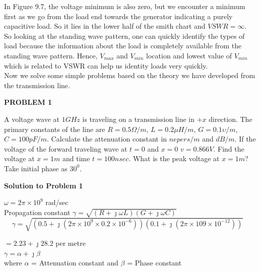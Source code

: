 In Figure 9.7, the voltage minimum is also zero, but we encounter a minimum first as we go from the load end towards the generator indicating a purely capacitive load. So it lies in the lower half of the smith chart and $VSWR=\infty$.\\

So looking at the standing wave pattern, one can quickly identify the types of load because the information about the load is completely available from the standing wave pattern. Hence, ${V_{max}}$ and ${V_{min}}$ location and lowest value of ${V_{min}}$ which is related to VSWR can help us identity loads very quickly.\\

Now we solve some simple problems based on the theory we have developed from the transmission line.\\

\begin{center}
\textbf{PROBLEM 1}
\end{center}

A voltage wave at ${1GH}z$ is traveling on a transmission line in ${+x}$ direction. The primary constants of the line are ${R=0.5\Omega/m}$, ${L=0.2\mu H/m}$, ${G=0.1\upsilon/m}$, ${C=100pF/m}$. Calculate the attenuation constant in ${nepers/m}$ and ${dB/m}$. If the voltage of the forward traveling wave at ${t=0}$ and ${x=0}$ ${v}=0.866V$. Find the voltage at ${x=1m}$ and time ${t=100nsec}$. What is the peak voltage at ${x=1m?}$ Take initial phase as ${30^0}$.


\begin{center}
\textbf{Solution to Problem 1}
\end{center}
$ \omega = 2\pi\times 10^{9} $ rad/sec\\
Propagation constant $\gamma = \sqrt{(R + \jmath\omega L)(G + \jmath\omega C)}$
\begin{dmath*}
\gamma = \sqrt{(0.5 + \jmath( 2\pi\times 10^{9} \times 0.2\times 10^{-6}))(0.1 + \jmath (2\pi\times 10{9} \times 10^{-12}))} \quad
\end{dmath*}

$ = 2.23 + \jmath 28.2$ per metre\\ 
$\gamma = \alpha + \jmath\beta$\\
where $\alpha$ = Attenuation constant and $\beta$ = Phase constant\\

